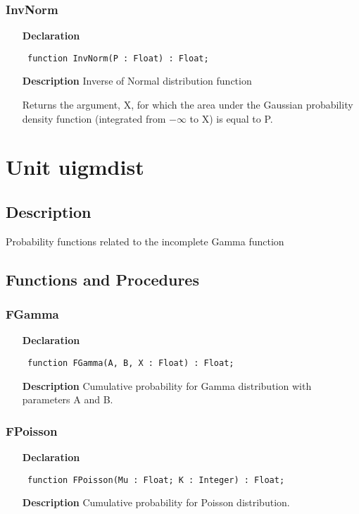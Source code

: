 \documentclass[12pt,a4paper,oneside]{report}
\newcommand{\declarationitem}[1]{\textbf{#1}}
\newcommand{\descriptiontitle}[1]{\textbf{#1}}
\newcommand{\code}[1]{\texttt{#1}}
\begin{document}
\subsubsection{InvNorm}
\label{uinvnorm-InvNorm}
\begin{itemize}\item[\declarationitem{Declaration}\hfill]
	\begin{flushleft}
		\code{
			function InvNorm(P : Float) : Float;}
	\end{flushleft}
	\item[\descriptiontitle{Description}]
	Inverse of Normal distribution function
	
	Returns the argument, X, for which the area under the Gaussian probability density function (integrated from $-\infty$ to X) is equal to P.
\end{itemize}
\section{Unit uigmdist}
\label{uigmdist}
\subsection{Description}
Probability functions related to the incomplete Gamma function \subsection{Functions and Procedures}
\subsubsection{FGamma}
\label{uigmdist-FGamma}
\begin{itemize}\item[\declarationitem{Declaration}\hfill]
	\begin{flushleft}
		\code{
			function FGamma(A, B, X : Float) : Float;}
	\end{flushleft}
	\item[\descriptiontitle{Description}]
	Cumulative probability for Gamma distribution with parameters A and B.
\end{itemize}
\subsubsection{FPoisson}
\label{uigmdist-FPoisson}
\begin{itemize}\item[\declarationitem{Declaration}\hfill]
	\begin{flushleft}
		\code{
			function FPoisson(Mu : Float; K : Integer) : Float;}
	\end{flushleft}
	\item[\descriptiontitle{Description}]
	Cumulative probability for Poisson distribution.
\end{itemize}
\end{document}
